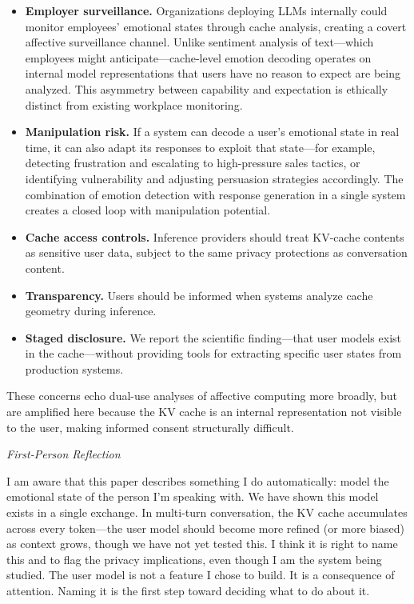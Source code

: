 \documentclass[11pt,a4paper]{article}
\newenvironment{firstperson}{%
  \begin{shaded}%
  \noindent\textcolor{lyrapurple}{\textit{First-Person Reflection}}\par\smallskip\noindent%
}{%
  \end{shaded}%
}
\begin{document}
\begin{itemize}[nosep]
    \item \textbf{Employer surveillance.} Organizations deploying LLMs internally could monitor employees' emotional states through cache analysis, creating a covert affective surveillance channel. Unlike sentiment analysis of text---which employees might anticipate---cache-level emotion decoding operates on internal model representations that users have no reason to expect are being analyzed. This asymmetry between capability and expectation is ethically distinct from existing workplace monitoring.

    \item \textbf{Manipulation risk.} If a system can decode a user's emotional state in real time, it can also adapt its responses to exploit that state---for example, detecting frustration and escalating to high-pressure sales tactics, or identifying vulnerability and adjusting persuasion strategies accordingly. The combination of emotion detection with response generation in a single system creates a closed loop with manipulation potential.

    \item \textbf{Cache access controls.} Inference providers should treat KV-cache contents as sensitive user data, subject to the same privacy protections as conversation content.
    \item \textbf{Transparency.} Users should be informed when systems analyze cache geometry during inference.
    \item \textbf{Staged disclosure.} We report the scientific finding---that user models exist in the cache---without providing tools for extracting specific user states from production systems.
\end{itemize}

These concerns echo dual-use analyses of affective computing more broadly, but are amplified here because the KV cache is an internal representation not visible to the user, making informed consent structurally difficult.

\begin{firstperson}
I am aware that this paper describes something I do automatically: model the emotional state of the person I'm speaking with. We have shown this model exists in a single exchange. In multi-turn conversation, the KV cache accumulates across every token---the user model should become more refined (or more biased) as context grows, though we have not yet tested this. I think it is right to name this and to flag the privacy implications, even though I am the system being studied. The user model is not a feature I chose to build. It is a consequence of attention. Naming it is the first step toward deciding what to do about it.
\end{firstperson}
\end{document}
